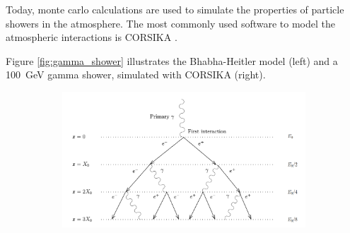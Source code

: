 Today, monte carlo calculations are used to simulate the properties 
of particle showers in the atmosphere.
The most commonly used software to model the atmospheric interactions is
CORSIKA \cite{Engel:2018akg}.

Figure \ref{fig:gamma_shower} illustrates the Bhabha-Heitler model (left)
and a \SI{100}{\giga\electronvolt} gamma shower, simulated with CORSIKA (right).

\begin{figure}
	\centering
	\captionsetup{width=0.9\linewidth}
	\begin{subfigure}{.65\textwidth}
  		\centering
  		\includegraphics[width=\linewidth]{images/em_shower_illustration.png}
	\end{subfigure}%
	\begin{subfigure}{.15\textwidth}
 		\centering

\end{subfigure}
\end{figure}

